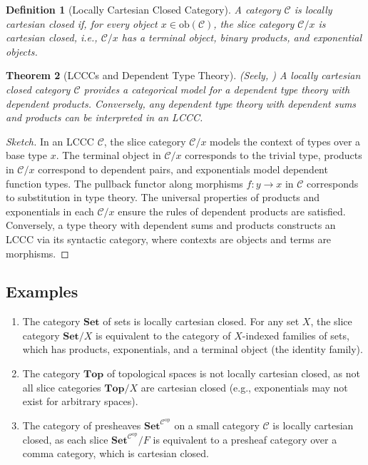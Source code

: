 \documentclass{article}
\theoremstyle{plain}
\newtheorem{theorem}{Theorem}[section]
\newtheorem{definition}[theorem]{Definition}
\theoremstyle{remark}
\begin{document}
\begin{definition}[Locally Cartesian Closed Category]
A category $\mathcal{C}$ is \emph{locally cartesian closed} if, for every object $x \in \mathrm{ob}(\mathcal{C})$, the slice category $\mathcal{C}/x$ is cartesian closed, i.e., $\mathcal{C}/x$ has a terminal object, binary products, and exponential objects.
\end{definition}

\begin{theorem}[LCCCs and Dependent Type Theory]
\label{thm:lccc-type-theory}
(Seely, \cite{Seely87}) A locally cartesian closed category $\mathcal{C}$ provides a categorical model for a dependent type theory with dependent products. Conversely, any dependent type theory with dependent sums and products can be interpreted in an LCCC.
\end{theorem}

\begin{proof}[Sketch]
In an LCCC $\mathcal{C}$, the slice category $\mathcal{C}/x$ models the context of types over a base type $x$. The terminal object in $\mathcal{C}/x$ corresponds to the trivial type, products in $\mathcal{C}/x$ correspond to dependent pairs, and exponentials model dependent function types. The pullback functor along morphisms $f : y \to x$ in $\mathcal{C}$ corresponds to substitution in type theory. The universal properties of products and exponentials in each $\mathcal{C}/x$ ensure the rules of dependent products are satisfied. Conversely, a type theory with dependent sums and products constructs an LCCC via its syntactic category, where contexts are objects and terms are morphisms.
\end{proof}

\subsection{Examples}

\begin{enumerate}
    \item The category $\mathbf{Set}$ of sets is locally cartesian closed. For any set $X$, the slice category $\mathbf{Set}/X$ is equivalent to the category of $X$-indexed families of sets, which has products, exponentials, and a terminal object (the identity family).
    \item The category $\mathbf{Top}$ of topological spaces is not locally cartesian closed, as not all slice categories $\mathbf{Top}/X$ are cartesian closed (e.g., exponentials may not exist for arbitrary spaces).
    \item The category of presheaves $\mathbf{Set}^{\mathcal{C}^{\mathrm{op}}}$ on a small category $\mathcal{C}$ is locally cartesian closed, as each slice $\mathbf{Set}^{\mathcal{C}^{\mathrm{op}}}/F$ is equivalent to a presheaf category over a comma category, which is cartesian closed.
\end{enumerate}
\end{document}
